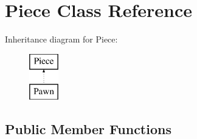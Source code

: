 \hypertarget{class_piece}{\section{Piece Class Reference}
\label{class_piece}
}
Inheritance diagram for Piece\-:\begin{figure}[H]
\begin{center}
\leavevmode
\includegraphics[height=2.000000cm]{class_piece}
\end{center}
\end{figure}
\subsection*{Public Member Functions}
